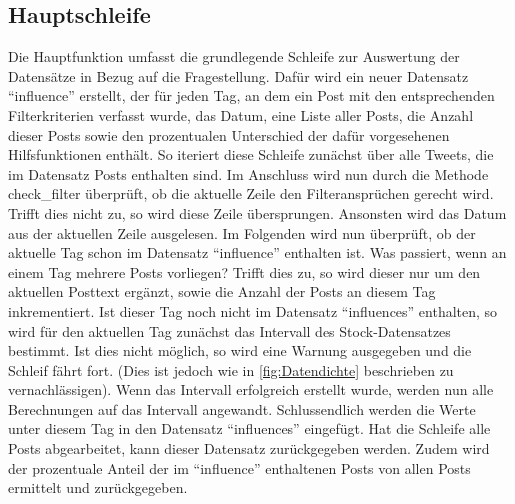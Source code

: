 \documentclass{article}
\begin{document}
\subsection{Hauptschleife}
Die Hauptfunktion umfasst die grundlegende Schleife zur Auswertung der Datensätze in Bezug auf die Fragestellung.
Dafür wird ein neuer Datensatz ``influence'' erstellt, der für jeden Tag, an dem ein Post mit den entsprechenden Filterkriterien verfasst wurde, das Datum, eine Liste aller Posts, die Anzahl dieser Posts sowie den prozentualen Unterschied der dafür vorgesehenen Hilfsfunktionen enthält.
So iteriert diese Schleife zunächst über alle Tweets, die im Datensatz Posts enthalten sind.
Im Anschluss wird nun durch die Methode check\_filter überprüft, ob die aktuelle Zeile den Filteransprüchen gerecht wird.
Trifft dies nicht zu, so wird diese Zeile übersprungen.
Ansonsten wird das Datum aus der aktuellen Zeile ausgelesen.
Im Folgenden wird nun überprüft, ob der aktuelle Tag schon im Datensatz ``influence'' enthalten ist. Was passiert, wenn an einem Tag mehrere Posts vorliegen? Trifft dies zu, so wird dieser nur um den aktuellen Posttext ergänzt, sowie die Anzahl der Posts an diesem Tag inkrementiert.
Ist dieser Tag noch nicht im Datensatz ``influences'' enthalten, so wird für den aktuellen Tag zunächst das Intervall des Stock-Datensatzes bestimmt.
Ist dies nicht möglich, so wird eine Warnung ausgegeben und die Schleif fährt fort.
(Dies ist jedoch wie in \ref{fig:Datendichte} beschrieben zu vernachlässigen).
Wenn das Intervall erfolgreich erstellt wurde, werden nun alle Berechnungen auf das Intervall angewandt.
Schlussendlich werden die Werte unter diesem Tag in den Datensatz ``influences'' eingefügt.
Hat die Schleife alle Posts abgearbeitet, kann dieser Datensatz zurückgegeben werden.
Zudem wird der prozentuale Anteil der im ``influence'' enthaltenen Posts von allen Posts ermittelt und zurückgegeben.
\end{document}
